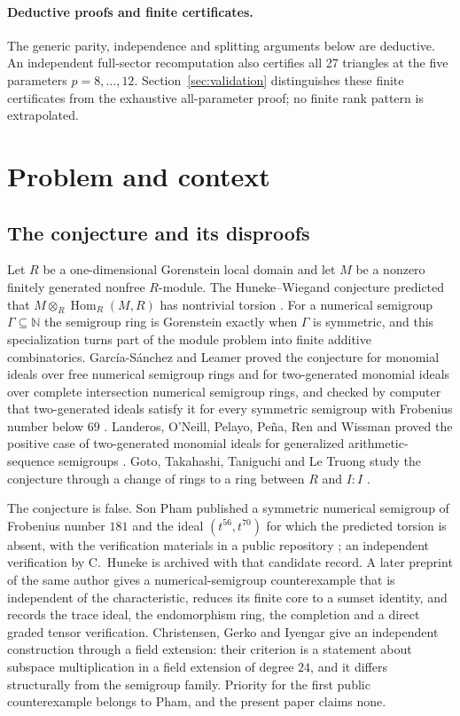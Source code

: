 \documentclass[11pt]{article}
\theoremstyle{definition}
\theoremstyle{remark}
\newcommand{\N}{\mathbb N}
\begin{document}
\paragraph{Deductive proofs and finite certificates.}
The generic parity, independence and splitting arguments below are deductive.
An independent full-sector recomputation also certifies all 27 triangles at
the five parameters $p=8,\ldots,12$.
Section~\ref{sec:validation} distinguishes these finite certificates from
the exhaustive all-parameter proof; no finite rank pattern is extrapolated.

\section{Problem and context}\label{sec:context}

\subsection{The conjecture and its disproofs}

Let $R$ be a one-dimensional Gorenstein local domain and let $M$ be a nonzero
finitely generated nonfree $R$-module. The Huneke--Wiegand conjecture predicted
that $M\otimes_R\operatorname{Hom}_R(M,R)$ has nontrivial torsion
\cite{HunekeWiegand}. For a numerical semigroup $\Gamma\subseteq\N$ the
semigroup ring is Gorenstein exactly when $\Gamma$ is symmetric, and this
specialization turns part of the module problem into finite additive
combinatorics. Garc\'ia-S\'anchez and Leamer proved the conjecture for monomial ideals
over free numerical semigroup rings and for two-generated monomial ideals over
complete intersection numerical semigroup rings, and checked by computer that
two-generated ideals satisfy it for every symmetric semigroup with Frobenius
number below $69$ \cite{GarciaSanchezLeamer}. Landeros, O'Neill, Pelayo, Pe\~na, Ren and Wissman
proved the positive case of two-generated monomial ideals for generalized
arithmetic-sequence semigroups \cite{Landeros}. Goto, Takahashi, Taniguchi and
Le Truong study the conjecture through a change of rings to a ring between $R$
and $I{:}I$ \cite{Goto}.

The conjecture is false. Son Pham published a symmetric numerical semigroup of
Frobenius number $181$ and the ideal $(t^{56},t^{70})$ for which the predicted
torsion is absent, with the verification materials in a public repository
\cite{PhamRepo}; an independent verification by C.~Huneke is archived with that
candidate record. A later preprint of the same author \cite{Pham} gives a
numerical-semigroup counterexample that is independent of the characteristic,
reduces its finite core to a sumset identity, and records the trace ideal, the
endomorphism ring, the completion and a direct graded tensor verification.
Christensen, Gerko and Iyengar \cite{CGI} give an independent construction
through a field extension: their criterion is a statement about subspace
multiplication in a field extension of degree $24$, and it differs structurally
from the semigroup family. Priority for the first public counterexample belongs
to Pham, and the present paper claims none.
\end{document}
